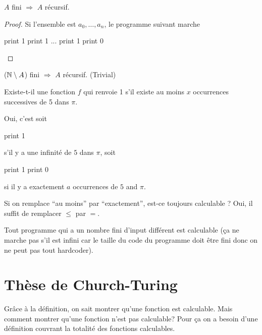 \begin{myprop}
	$A$ fini $\Rightarrow$ $A$ récursif.
    \begin{proof}
      Si l'ensemble est $a_0, \ldots, a_n$, le programme suivant marche
      \begin{algorithmic}
        \STATE print 1
        \STATE print 1
        \STATE ...
        \STATE print 1
        \ELSE
        \STATE print 0
        \ENDIF
      \end{algorithmic}
    \end{proof}
\end{myprop}

\begin{myprop}
	($\mathbb{N} \setminus A$) fini $\Rightarrow$ $A$ récursif. (Trivial)
\end{myprop}

\begin{myexem}
  Existe-t-il une fonction $f$ qui renvoie 1 s'il existe au moins $x$ occurrences successives de 5 dans $\pi$.

  Oui, c'est soit
  \begin{algorithmic}
    \STATE print 1
  \end{algorithmic}
  s'il y a une infinité de $5$ dans $\pi$,
  soit
  \begin{algorithmic}
    \STATE print 1
    \ELSE
    \STATE print 0
    \ENDIF
  \end{algorithmic}
  si il y a exactement $a$ occurrences de $5$ and $\pi$.

  Si on remplace ``au moins'' par ``exactement'', est-ce toujours calculable ?
  Oui, il suffit de remplacer $\leq$ par $=$.
\end{myexem}

\begin{myprop}
  Tout programme qui a un nombre fini d'input différent est calculable (ça ne marche pas s'il est infini car le taille du code du programme doit être fini donc on ne peut pas tout hardcoder).
\end{myprop}


\section{Thèse de Church-Turing}
\label{sub:th_se_de_church_turing}
Grâce à la définition, on sait montrer qu'une fonction est calculable. Mais comment
montrer qu'une fonction n'est pas calculable? Pour ça on a besoin d'une définition
couvrant la totalité des fonctions calculables.

